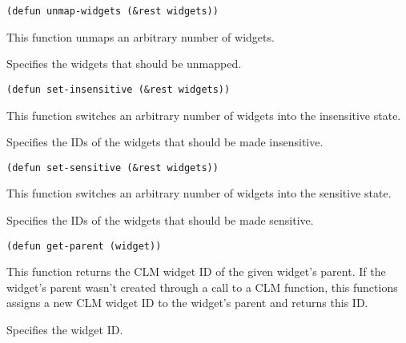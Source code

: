 \begin{lispd}
\syntax\begin{verbatim}
(defun unmap-widgets (&rest widgets))
\end{verbatim}
\beschr This function unmaps an arbitrary number of widgets.
\parameter
\begin{paramd}
 Specifies the widgets that should be unmapped.
\end{paramd}
\end{lispd}

\begin{lispd}
\syntax\begin{verbatim}
(defun set-insensitive (&rest widgets))
\end{verbatim}
\beschr This function switches an arbitrary number of widgets into the
insensitive state.
\parameter
\begin{paramd}
 Specifies the IDs of the widgets that should be made 
insensitive.
\end{paramd}
\end{lispd}

\begin{lispd}
\syntax\begin{verbatim}
(defun set-sensitive (&rest widgets))
\end{verbatim}
\beschr This function switches an arbitrary number of widgets into the
sensitive state.
\parameter
\begin{paramd}
 Specifies the IDs of the widgets that should be made
sensitive.
\end{paramd}
\end{lispd}

\begin{lispd}
\syntax\begin{verbatim}
(defun get-parent (widget))
\end{verbatim}
\beschr This function returns the CLM widget ID of the given widget's parent.
If the widget's parent wasn't created through a call to a CLM function, this
functions assigns a new CLM widget ID to the widget's parent and returns this 
ID.
\parameter
\begin{paramd}
 Specifies the widget ID.
\end{paramd}
\end{lispd}

